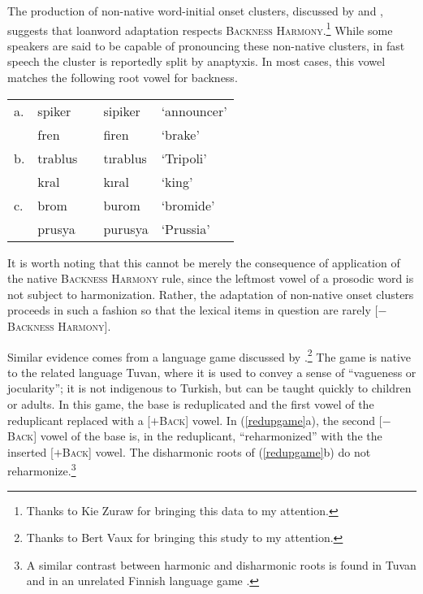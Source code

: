 The production of non-native word-initial onset clusters, discussed by \citet{Clements1982} and \citet{Kaun1999}, suggests that loanword adaptation respects \textsc{Backness Harmony}.\footnote{Thanks to Kie Zuraw for bringing this data to my attention.} While some speakers are said to be capable of pronouncing these non-native clusters, in fast speech the cluster is reportedly split by anaptyxis. In most cases, this vowel matches the following root vowel for backness.

\begin{example} 
\begin{tabular}{lllll}
a. & {spiker}  & \alt{} & {sipiker}  & `announcer' \\
   & {fren}    & \alt{} & {firen}    & `brake'     \\
b. & {trablus} & \alt{} & {tırablus} & `Tripoli'   \\
   & {kral}    & \alt{} & {kıral}    & `king'      \\
c. & {brom}    & \alt{} & {burom}    & `bromide'   \\
   & {prusya}  & \alt{} & {purusya}  & `Prussia'   \\
\end{tabular}
\end{example}

\noindent
It is worth noting that this cannot be merely the consequence of application of the native \textsc{Backness Harmony} rule, since the leftmost vowel of a prosodic word is not subject to harmonization. Rather, the adaptation of non-native onset clusters proceeds in such a fashion so that the lexical items in question are rarely [$-$\textsc{Backness Harmony}].

Similar evidence comes from a language game discussed by \citet{Harrison2001}.\footnote{Thanks to Bert Vaux for bringing this study to my attention.} 
The game is native to the related language Tuvan, where it is used to convey a sense of ``vagueness or jocularity''; it is not indigenous to Turkish, but can be taught quickly to children or adults. In this game, the base is reduplicated and the first vowel of the reduplicant replaced with a [$+$\textsc{Back}] vowel. In (\ref{redupgame}a), the second [$-$\textsc{Back}] vowel of the base is, in the reduplicant, ``reharmonized'' with the the inserted [$+$\textsc{Back}] vowel. The disharmonic roots of (\ref{redupgame}b) do not reharmonize.\footnote{A similar contrast between harmonic and disharmonic roots is found in Tuvan \citep{Harrison2001} and in an unrelated Finnish language game \citep{Campbell1986}.}

